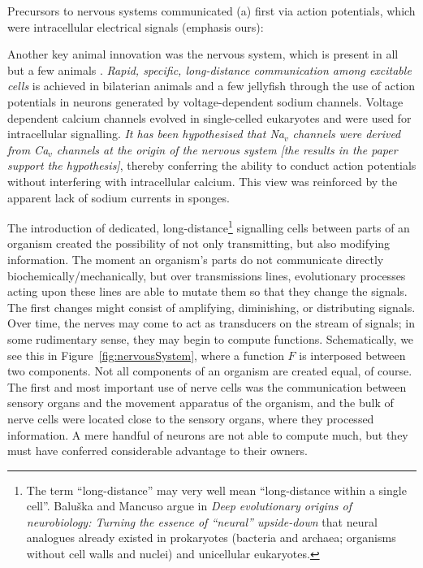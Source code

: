 Precursors to nervous systems communicated (a) first via action potentials, which were intracellular electrical signals \cite{Liebeskind31052011} (emphasis ours):
\begin{emquote}
Another key animal innovation was the nervous system, which is present in all but a few animals . {\em Rapid, specific, long-distance communication among excitable cells} is achieved in bilaterian animals and a few jellyfish  through the use of action potentials  in neurons generated by voltage-dependent sodium  channels. Voltage dependent calcium  channels evolved in single-celled eukaryotes and were used for intracellular signalling. {\em It has been hypothesised that Na$_v$ channels were derived from Ca$_v$ channels at the origin of the nervous system} \textsl{{\upshape[}the results in the paper support the hypothesis{\upshape]}}, thereby conferring the ability to conduct action potentials without interfering with intracellular calcium. This view was reinforced by the apparent lack of sodium currents in sponges.
\end{emquote}

The introduction of dedicated, long-distance\footnote{The term ``long-distance'' may very well mean ``long-distance within a single cell''. Balu\v{s}ka and Mancuso argue in {\em Deep evolutionary origins of neurobiology: Turning the essence of ``neural'' upside-down} \cite{frantisek} that neural analogues already existed in prokaryotes (bacteria and archaea; organisms without cell walls and nuclei) and unicellular eukaryotes.} signalling cells between parts of an organism created the possibility of not only transmitting, but also modifying information. The moment an organism's parts do not communicate directly biochemically/mechanically, but over transmissions lines, evolutionary processes acting upon these lines are able to mutate them so that they change the signals. The first changes might consist of amplifying, diminishing, or distributing signals. Over time, the nerves may come to act as transducers on the stream of signals; in some rudimentary sense, they may begin to compute functions. Schematically, we see this in Figure~\ref{fig:nervousSystem}, where a function $F$ is interposed between two components. Not all components of an organism are created equal, of course. The first and most important use of nerve cells was the communication between sensory organs and the movement apparatus of the organism, and the bulk of nerve cells were located close to the sensory organs, where they processed information. A mere handful of neurons are not able to compute much, but they must have conferred considerable advantage to their owners.


